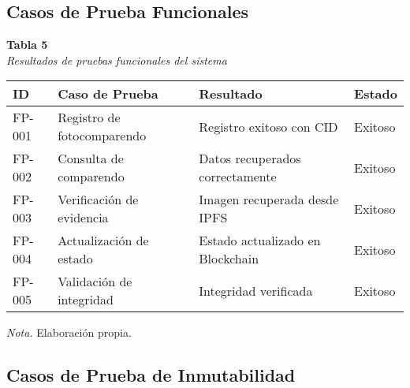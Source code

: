 
\subsection{Casos de Prueba Funcionales}

\begin{table}[htbp]
    \begin{flushleft}
        \textbf{Tabla 5}\\[2em]
        \textit{Resultados de pruebas funcionales del sistema}
    \end{flushleft}
    \vspace{1em}
    \centering
    \begin{tabular}{p{2cm} p{4cm} p{3cm} p{3cm}}
        \toprule
        \textbf{ID} & \textbf{Caso de Prueba} & \textbf{Resultado} & \textbf{Estado} \\
        \midrule
        FP-001 & Registro de fotocomparendo & Registro exitoso con CID & Exitoso \\
        FP-002 & Consulta de comparendo & Datos recuperados correctamente & Exitoso \\
        FP-003 & Verificación de evidencia & Imagen recuperada desde IPFS & Exitoso \\
        FP-004 & Actualización de estado & Estado actualizado en Blockchain & Exitoso \\
        FP-005 & Validación de integridad & Integridad verificada & Exitoso \\
        \bottomrule
    \end{tabular}
    \vspace{2em}
    \begin{flushleft}
        \textit{Nota.} Elaboración propia.
    \end{flushleft}
    \label{tab:resultados_funcionales}
\end{table}

\subsection{Casos de Prueba de Inmutabilidad}

